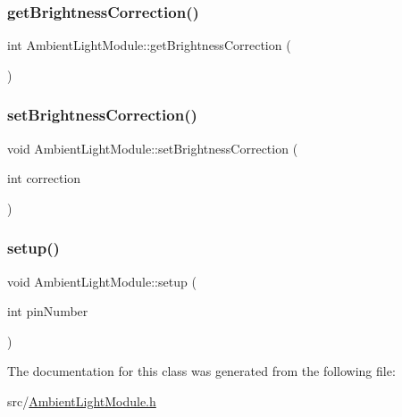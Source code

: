\subsubsection{\texorpdfstring{getBrightnessCorrection()}{getBrightnessCorrection()}}
{\footnotesize\ttfamily int Ambient\+Light\+Module\+::get\+Brightness\+Correction (\begin{DoxyParamCaption}{ }\end{DoxyParamCaption})}

\mbox{\label{class_ambient_light_module_a1a8cce98e966888ab2f1b177835b3efe}} 
\subsubsection{\texorpdfstring{setBrightnessCorrection()}{setBrightnessCorrection()}}
{\footnotesize\ttfamily void Ambient\+Light\+Module\+::set\+Brightness\+Correction (\begin{DoxyParamCaption}\item[{int}]{correction }\end{DoxyParamCaption})}

\mbox{\label{class_ambient_light_module_a81e6f755ce07dfabe34bcb7ef61fcf41}} 
\subsubsection{\texorpdfstring{setup()}{setup()}}
{\footnotesize\ttfamily void Ambient\+Light\+Module\+::setup (\begin{DoxyParamCaption}\item[{int}]{pin\+Number }\end{DoxyParamCaption})}



The documentation for this class was generated from the following file\+:\begin{DoxyCompactItemize}
\item 
src/\mbox{\hyperlink{_ambient_light_module_8h}{Ambient\+Light\+Module.\+h}}\end{DoxyCompactItemize}
